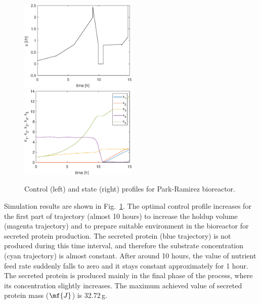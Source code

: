 \begin{figure}[htb]
	\includegraphics[width=0.5\textwidth]{examples/problem_pr_bior/graphs/u.eps}
	\includegraphics[width=0.5\textwidth]{examples/problem_pr_bior/graphs/x.eps}
	\caption{Control (left) and state (right) profiles for Park-Ramirez bioreactor.} \label{fig:prob_pr_bior}
\end{figure}

Simulation results are shown in Fig.~\ref{fig:prob_pr_bior}. The
optimal control profile increases for the first part of trajectory
(almost 10 hours) to increase the holdup volume (magenta trajectory)
and to prepare suitable environment in the bioreactor for secreted
protein production. The secreted protein (blue trajectory) is not
produced during this time interval, and therefore the substrate
concentration (cyan trajectory) is almost constant. After around 10
hours, the value of nutrient feed rate suddenly falls to zero and it
stays constant approximately for 1 hour. The secreted protein is
produced mainly in the final phase of the process, where its
concentration slightly increases. The maximum achieved value of
secreted protein mass ($\mf{J}$) is 32.72\,g.

